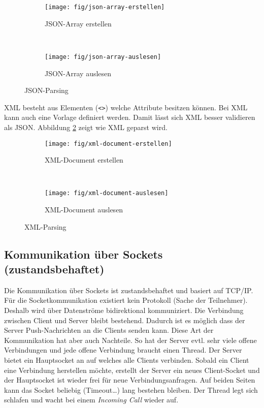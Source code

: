 \begin{figure}
	\centering
	\begin{subfigure}[b]{0.48\textwidth}
		\texttt{[image: fig/json-array-erstellen]}
		\caption{JSON-Array erstellen}
	\end{subfigure}
	~
	\begin{subfigure}[b]{0.48\textwidth}
		\texttt{[image: fig/json-array-auslesen]}
		\caption{JSON-Array auslesen}
	\end{subfigure}
	\caption{JSON-Parsing}
	\label{fig:json}
\end{figure}

XML besteht aus Elementen (\texttt{<>}) welche Attribute besitzen können. Bei XML kann auch eine Vorlage definiert werden. Damit lässt sich XML besser validieren als JSON. Abbildung \ref{fig:xml} zeigt wie XML geparst wird.

\begin{figure}
	\centering
	\begin{subfigure}[b]{0.48\textwidth}
		\texttt{[image: fig/xml-document-erstellen]}
		\caption{XML-Document erstellen}
	\end{subfigure}
	~
	\begin{subfigure}[b]{0.48\textwidth}
		\texttt{[image: fig/xml-document-auslesen]}
		\caption{XML-Document auslesen}
	\end{subfigure}
	\caption{XML-Parsing}
	\label{fig:xml}
\end{figure}

\subsection{Kommunikation über Sockets (zustandsbehaftet)}

Die Kommunikation über Sockets ist zustandsbehaftet und basiert auf TCP/IP. Für die Socketkommunikation existiert kein Protokoll (Sache der Teilnehmer). Deshalb wird über Datenströme bidirektional kommuniziert. Die Verbindung zwischen Client und Server bleibt bestehend. Dadurch ist es möglich dass der Server Push-Nachrichten an die Clients senden kann. Diese Art der Kommunikation hat aber auch Nachteile. So hat der Server evtl. sehr viele offene Verbindungen und jede offene Verbindung braucht einen Thread.
Der Server bietet ein Hauptsocket an auf welches alle Clients verbinden. Sobald ein Client eine Verbindung herstellen möchte, erstellt der Server ein neues Client-Socket und der Hauptsocket ist wieder frei für neue Verbindungsanfragen. Auf beiden Seiten kann das Socket beliebig (Timeout\dots) lang bestehen bleiben. Der Thread legt sich schlafen und wacht bei einem \emph{Incoming Call} wieder auf.

